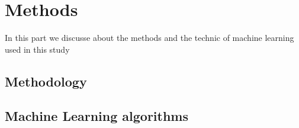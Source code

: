 \section{Methods}\label{Methods}
In this part we discusse about the methods and the technic of machine learning used in this study
\subsection{Methodology}
\subsection{Machine Learning algorithms}


